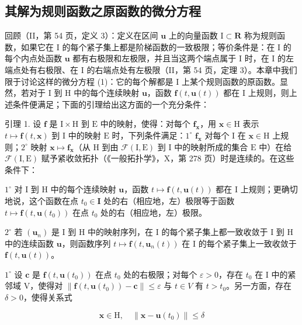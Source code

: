 \subsection{其解为规则函数之原函数的微分方程}

回顾（II，第 54 页，定义 3）：定义在区间 \(\mathbf{u}\) 上的向量函数 \(\mathrm{I} \subset \mathbf{R}\) 称为规则函数，如果它在 I 的每个紧子集上都是阶梯函数的一致极限；等价条件是：在 I 的每个内点处函数 \(\mathbf{u}\) 都有右极限和左极限，并且当这两个端点属于 I 时，在 I 的左端点处有右极限、在 I 的右端点处有左极限（II，第 54 页，定理 3）。本章中我们限于讨论这样的微分方程 (1)：它的每个解都是 I 上某个规则函数的原函数。显然，若对于 I 到 H 中的每个连续映射 \(\mathbf{u}\)，函数 \(\mathbf{f}(t, \mathbf{u}(t))\) 都在 I 上规则，则上述条件便满足；下面的引理给出这方面的一个充分条件：

引理 1. 设 \(\mathbf{f}\) 是 \(\mathrm{I} \times \mathrm{H}\) 到 \(\mathrm{E}\) 中的映射，使得：对每个 \(\mathbf{f}_{\mathbf{x}}\)，用 \(\mathbf{x} \in \mathrm{H}\) 表示 \(t \mapsto \mathbf{f}(t, \mathbf{x})\) 到 \(\mathrm{I}\) 中的映射 \(\mathrm{E}\) 时，下列条件满足：\(1^{\circ}\) \(\mathbf{f}_{\mathbf{x}}\) 对每个 \(\mathrm{I}\) 在 \(\mathbf{x} \in \mathrm{H}\) 上规则；\(2^{\circ}\) 映射 \(\mathbf{x} \mapsto \mathbf{f}_{\mathbf{x}}\)（从 \(\mathrm{H}\) 到由 \(\mathcal{F}(\mathrm{I}, \mathrm{E})\) 到 \(\mathrm{I}\) 中的映射所成的集合 \(\mathrm{E}\) 中）在给 \(\mathcal{F}(\mathrm{I}, \mathrm{E})\) 赋予紧收敛拓扑（《一般拓扑学》，X，第 278 页）时是连续的。在这些条件下：

\(1^{\circ}\) 对 I 到 H 中的每个连续映射 \(\mathbf{u}\)，函数 \(t \mapsto \mathbf{f}(t, \mathbf{u}(t))\) 都在 I 上规则；更确切地说，这个函数在点 \(t_0 \in \mathbf{I}\) 处的右（相应地，左）极限等于函数 \(t \mapsto \mathbf{f}(t, \mathbf{u}(t_0))\) 在点 \(t_0\) 处的右（相应地，左）极限。

\(2^{\circ}\) 若 \((\mathbf{u}_n)\) 是 I 到 H 中的映射序列，在 I 的每个紧子集上都一致收敛于 I 到 H 中的连续函数 \(\mathbf{u}\)，则函数序列 \(t \mapsto \mathbf{f}(t, \mathbf{u}_n(t))\) 在 I 的每个紧子集上一致收敛于 \(\mathbf{f}(t, \mathbf{u}(t))\)。

\(1^{\circ}\) 设 \(\mathbf{c}\) 是 \(\mathbf{f}(t, \mathbf{u}(t_0))\) 在点 \(t_0\) 处的右极限；对每个 \(\varepsilon > 0\)，存在 \(t_0\) 在 I 中的紧邻域 V，使得对 \(\| \mathbf{f}(t, \mathbf{u}(t_0)) - \mathbf{c} \| \leqslant \varepsilon\) 与 \(t \in V\) 有 \(t > t_0\)。另一方面，存在 \(\delta > 0\)，使得关系式

\[
\mathbf {x} \in \mathrm{H}, \quad \| \mathbf {x} - \mathbf {u} (t _ {0}) \| \leqslant \delta
\]

